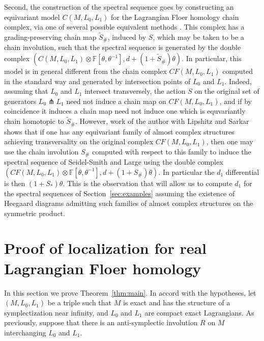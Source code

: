 \documentclass[11pt,reqno]{amsart}
\theoremstyle{definition}
\theoremstyle{remark}
\newcommand{\bF}{\mathbb{F}}
\newcommand{\CF}{\mathit{CF}}
\numberwithin{equation}{section}
\begin{document}
Second, the construction of the spectral sequence goes by constructing an equivariant model $C(M, L_0, L_1)$ for the Lagrangian Floer homology chain complex, via one of several possible equivalent methods \cite{SS10, HLS-equivariant, Large}. This complex has a grading-preserving chain map $\widetilde{S}_\#$, induced by $S$, which may be taken to be a chain involution, such that the spectral sequence is generated by the double complex $(C(M,L_0,L_1)\otimes \bF[\theta,\theta^{-1}], d +(1+\widetilde{S}_{\#})\theta)$. In particular, this model is in general different from the chain complex $\CF(M,L_0,L_1)$ computed in the standard way and generated by intersection points of $L_0$ and $L_1$. Indeed, assuming that $L_0$ and $L_1$ intersect transversely, the action $S$ on the original set of generators $L_0 \pitchfork L_1$ need not induce a chain map on $CF(M,L_0,L_1)$, and if by coincidence it induces a chain map need not induce one which is equvariantly chain homotopic to $\widetilde{S}_{\#}$. However, work of the author with Lipshitz and Sarkar \cite[Proposition 4.3]{HLS-equivariant} shows that if one has any equivariant family of almost complex structures achieving transversality on the original complex $CF(M, L_0, L_1)$, then one may use the chain involution $S_{\#}$ computed with respect to this family to induce the spectral sequence of Seidel-Smith and Large using the double complex $(CF(M,L_0,L_1)\otimes \bF[\theta,\theta^{-1}], d +(1+S_{\#})\theta)$. In particular the $d_1$ differential is then $(1+S_*)\theta$. This is the observation that will allow us to compute $d_1$ for the spectral sequences of Section~\ref{sec:examples} assuming the existence of Heegaard diagrams admitting such families of almost complex structures on the symmetric product. 

 

\section{Proof of localization for real Lagrangian Floer homology} \label{sec:proof}

In this section we prove Theorem~\ref{thm:main}. In accord with the hypotheses, let $(M, L_0, L_1)$ be a triple such that $M$ is exact and has the structure of a symplectization near infinity, and $L_0$ and $L_1$ are compact exact Lagrangians. As previously, suppose that there is an anti-symplectic involution $R$ on $M$ interchanging $L_0$ and $L_1$. 
\end{document}
